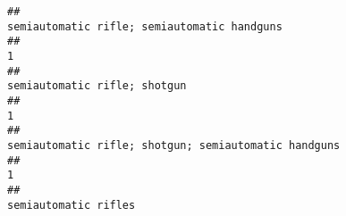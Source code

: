 \documentclass[
]{article}
\begin{document}
\begin{verbatim}
##                                                                                                                                                                                                                                                                                                                                                           semiautomatic rifle; semiautomatic handguns 
##                                                                                                                                                                                                                                                                                                                                                                                                     1 
##                                                                                                                                                                                                                                                                                                                                                                          semiautomatic rifle; shotgun 
##                                                                                                                                                                                                                                                                                                                                                                                                     1 
##                                                                                                                                                                                                                                                                                                                                                  semiautomatic rifle; shotgun; semiautomatic handguns 
##                                                                                                                                                                                                                                                                                                                                                                                                     1 
##                                                                                                                                                                                                                                                                                                                                                                                  semiautomatic rifles 

\end{verbatim}
\end{document}
